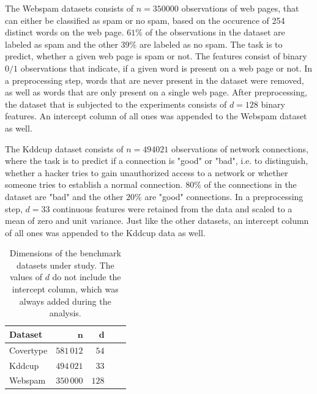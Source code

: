 The Webspam datasets consists of $n=350000$ observations of
web pages, that can either be classified as spam or no spam, based
on the occurence of 254 distinct words on the web page.
$61\%$ of the observations in the dataset are labeled as spam
and the other $39\%$ are labeled as no spam. The task is to predict,
whether a given web page is spam or not.
The features consist of binary $0/1$ observations that indicate, if
a given word is present on a web page or not.
In a preprocessing step, words that are never present
in the dataset were removed, as well
as words that are only present on a single web page.
After preprocessing, the dataset that is subjected to the
experiments consists of $d=128$ binary features.
An intercept column of all ones was appended to the Webspam dataset
as well.

The Kddcup dataset consists of $n=494021$ observations of network
connections, where the task is to predict if a connection is
"good" or "bad", i.e. to distinguish, whether a hacker tries
to gain unauthorized
access to a network or whether someone tries to establish a
normal connection.
$80\%$ of the connections in the dataset are "bad" and the other
$20\%$ are "good" connections.
In a preprocessing step, $d=33$ continuous features
were retained from the data and scaled to a mean of zero and
unit variance. Just like the other datasets, an intercept column
of all ones was appended to the Kddcup data as well.


\begin{table}[ht!]
    \centering
    \begin{tabular}{ | l| r| r| r| r|}
        \hline
        \textbf{Dataset} & $\mathbf{n}$ & $\mathbf{d}$ \\ \hline
        Covertype        & $581\,012$   & $54$         \\ \hline
        Kddcup           & $494\,021$   & $33$         \\ \hline
        Webspam          & $350\,000$   & $128$        \\ \hline
    \end{tabular}
    \caption{Dimensions of the benchmark datasets under study. The
        values of $d$ do not include the intercept column, which was
        always added during the analysis.}
    \label{tab:datasets}
\end{table}

